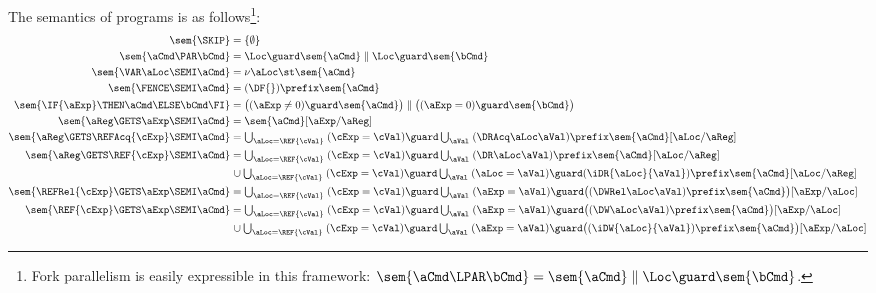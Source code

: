 The semantics of programs is as follows\footnote{Fork parallelism is easily expressible in this
  framework:
  $\sem{\aCmd \LPAR \bCmd} = \sem{\aCmd} \parallel \Loc \guard
  \sem{\bCmd}$.}:
\allowdisplaybreaks
\begin{align*}
  \sem{\SKIP} & =
  \{ \emptyset \}
  \\
  \sem{\aCmd \PAR \bCmd} & =
  \Loc \guard \sem{\aCmd} \parallel \Loc \guard \sem{\bCmd} 
  \\
  \sem{\VAR\aLoc\SEMI \aCmd} & =
  \nu \aLoc \st \sem{\aCmd}
  \\
  \sem{\FENCE\SEMI \aCmd} & =
  (\DF{}) \prefix \sem{\aCmd}
  \\  
  \sem{\IF{\aExp} \THEN \aCmd \ELSE \bCmd \FI} & =
  \bigl((\aExp \neq 0) \guard \sem{\aCmd}\bigr) \parallel \bigl((\aExp=0) \guard \sem{\bCmd}\bigr) 
  \\
  \sem{\aReg\GETS\aExp\SEMI \aCmd} & =
  \sem{\aCmd}[\aExp/\aReg] 
  \\
  \sem{\aReg\GETS\REFAcq{\cExp}\SEMI \aCmd} & =
  \textstyle\bigcup_{\aLoc=\REF{\cVal}}\; ({\cExp}=\cVal) \guard \textstyle\bigcup_\aVal\; (\DRAcq\aLoc\aVal) \prefix \sem{\aCmd}[\aLoc/\aReg] 
  \\
  \sem{\aReg\GETS\REF{\cExp}\SEMI \aCmd} & =
  \textstyle\bigcup_{\aLoc=\REF{\cVal}}\; ({\cExp}=\cVal) \guard \textstyle\bigcup_\aVal\; (\DR\aLoc\aVal) \prefix \sem{\aCmd}[\aLoc/\aReg] 
  \\ & \mkern2mu\cup \textstyle\bigcup_{\aLoc=\REF{\cVal}}\; ({\cExp}=\cVal) \guard \textstyle\bigcup_\aVal\; ({\aLoc}=\aVal) \guard (\iDR{\aLoc}{\aVal}) \prefix \sem{\aCmd}[\aLoc/\aReg]
  \\
  \sem{\REFRel{\cExp}\GETS\aExp\SEMI \aCmd} & =
  \textstyle\bigcup_{\aLoc=\REF{\cVal}}\; ({\cExp}=\cVal) \guard \textstyle\bigcup_\aVal\;  (\aExp=\aVal) \guard\bigl((\DWRel\aLoc\aVal) \prefix \sem{\aCmd}\bigr)[\aExp/\aLoc] 
  \\
  \sem{\REF{\cExp}\GETS\aExp\SEMI \aCmd} & =
  \textstyle\bigcup_{\aLoc=\REF{\cVal}}\; ({\cExp}=\cVal) \guard \textstyle\bigcup_\aVal\;  (\aExp=\aVal) \guard\bigl((\DW\aLoc\aVal) \prefix \sem{\aCmd}\bigr)[\aExp/\aLoc]
  \\ & \mkern2mu\cup \textstyle\bigcup_{\aLoc=\REF{\cVal}}\; ({\cExp}=\cVal) \guard \textstyle\bigcup_\aVal\; ({\aExp}=\aVal) \guard \bigl((\iDW{\aLoc}{\aVal}) \prefix \sem{\aCmd}\bigr)[\aExp/\aLoc]

\end{align*}
